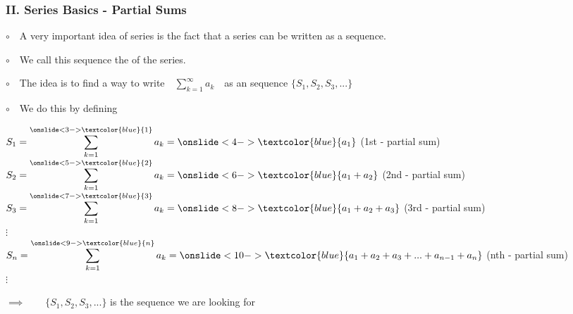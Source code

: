 \begin{frame}
\frametitle{II. Series Basics - Partial Sums}
\scriptsize

$\circ$ \,\, A very important idea of series is the fact that a series can be written as a sequence. 

\vspace{0.3cm}

$\circ$ \,\, We call this sequence the \quad{}\quad of the series.

\vspace{0.1cm}

$\circ$ \,\, The idea is to find a way to write \,\, $\displaystyle{\sum \limits_{k = 1}^{\infty} a_k}$ \,\, as an sequence $\displaystyle{\{S_1, S_2, S_3, ...\}}$\\

\vspace{0.1cm}

$\circ$ \,\, We do this by defining 

\qquad $\displaystyle{S_1 = \sum \limits_{k = 1}^{\onslide<3->{\textcolor{blue}{1}}} a_k = \onslide<4->{\textcolor{blue}{a_1}}}$ \hspace{4.4cm}(1st - partial sum) \\
\qquad $\displaystyle{S_2 = \sum \limits_{k = 1}^{\onslide<5->{\textcolor{blue}{2}}} a_k = \onslide<6->{\textcolor{blue}{a_1 + a_2}}}$ \hspace{3.8cm}(2nd - partial sum)\\
\qquad $\displaystyle{S_3 = \sum \limits_{k = 1}^{\onslide<7->{\textcolor{blue}{3}}} a_k = \onslide<8->{\textcolor{blue}{a_1 + a_2 + a_3}}}$ \hspace{3.2cm}(3rd - partial sum)\\
\qquad \quad $\displaystyle{\vdots}$\\
\qquad $\displaystyle{S_n = \sum \limits_{k = 1}^{\onslide<9->{\textcolor{blue}{n}}} a_k = \onslide<10->{\textcolor{blue}{a_1 + a_2 + a_3 + ... + a_{n-1} + a_n}}}$ \hspace{1.0cm}(nth - partial sum)\\
\qquad \quad $\displaystyle{\vdots}$ \\

\vspace{0.2cm}

\qquad $\implies \qquad \{S_1, S_2, S_3, ... \}$ \qquad is the sequence we are looking for

\end{frame}

